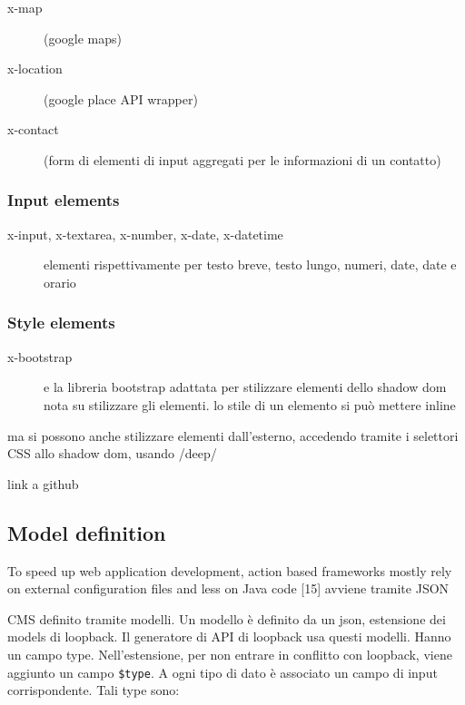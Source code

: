 \documentclass{sig-alternate}
\begin{document}
\begin{description}
       \item[x-map] (google maps)
       \item[x-location] (google place API wrapper)
       \item[x-contact] (form di elementi di input aggregati per le informazioni di un contatto)
\end{description}



\subsubsection{Input elements}

\begin{description}
       \item[x-input, x-textarea, x-number, x-date, x-datetime] elementi rispettivamente per testo breve, testo lungo, numeri, date, date e orario
\end{description}

\subsubsection{Style elements}

\begin{description}        
       \item[x-bootstrap] e la libreria bootstrap adattata
per stilizzare elementi dello shadow dom nota su stilizzare gli elementi. lo
stile di un elemento si può mettere inline 
\end{description}

 

ma si possono anche stilizzare elementi dall’esterno, accedendo tramite i selettori CSS allo shadow dom, usando /deep/

link a github 


\subsection{Model definition}

To speed up web application development, action based frameworks mostly rely on external configuration files and less on Java code [15]
avviene tramite JSON


CMS definito tramite modelli. Un modello è definito da un json, estensione dei models di loopback. Il generatore di API di loopback usa questi modelli. Hanno un campo type. Nell’estensione, per non entrare in conflitto con loopback, viene aggiunto un campo {\tt \$type}.
A ogni tipo di dato è associato un campo di input corrispondente. 
Tali type sono: 
\end{document}
